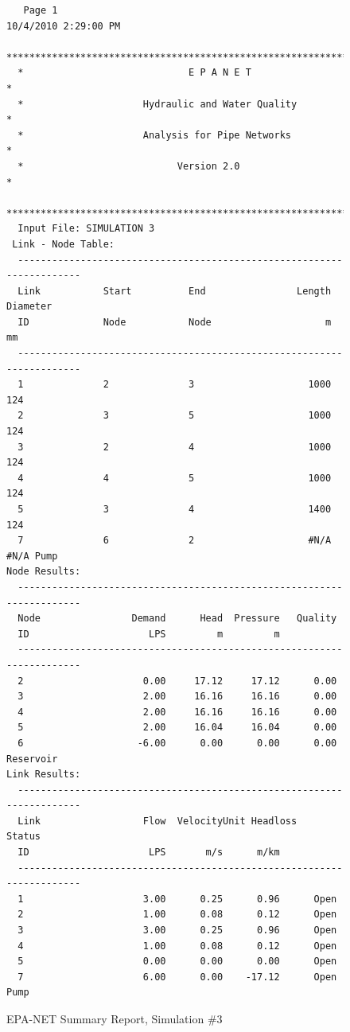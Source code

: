 \documentclass[11pt]{article}
\begin{document}
\begin{enumerate}
\begin{figure}[ht!] %
\centering

\begin{verbatim}
   Page 1                                            10/4/2010 2:29:00 PM
  **********************************************************************
  *                             E P A N E T                            *
  *                     Hydraulic and Water Quality                    *
  *                     Analysis for Pipe Networks                     *
  *                           Version 2.0                              *
  **********************************************************************
  Input File: SIMULATION 3
 Link - Node Table:
  ----------------------------------------------------------------------
  Link           Start          End                Length  Diameter
  ID             Node           Node                    m        mm
  ----------------------------------------------------------------------
  1              2              3                    1000       124
  2              3              5                    1000       124
  3              2              4                    1000       124
  4              4              5                    1000       124
  5              3              4                    1400       124
  7              6              2                    #N/A      #N/A Pump
Node Results:
  ----------------------------------------------------------------------
  Node                Demand      Head  Pressure   Quality
  ID                     LPS         m         m          
  ----------------------------------------------------------------------
  2                     0.00     17.12     17.12      0.00
  3                     2.00     16.16     16.16      0.00
  4                     2.00     16.16     16.16      0.00
  5                     2.00     16.04     16.04      0.00
  6                    -6.00      0.00      0.00      0.00 Reservoir
Link Results:
  ----------------------------------------------------------------------
  Link                  Flow  VelocityUnit Headloss    Status
  ID                     LPS       m/s      m/km
  ----------------------------------------------------------------------
  1                     3.00      0.25      0.96      Open
  2                     1.00      0.08      0.12      Open
  3                     3.00      0.25      0.96      Open
  4                     1.00      0.08      0.12      Open
  5                     0.00      0.00      0.00      Open
  7                     6.00      0.00    -17.12      Open Pump
  \end{verbatim}
     \caption{EPA-NET Summary Report, Simulation \#3}
   \label{fig:epanet3} 
\end{figure}


\end{enumerate}
\end{document}
